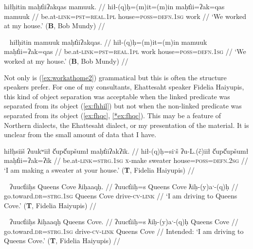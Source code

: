 \ex \label{ex:workathome}
\begingl
\glpreamble hiłḥitin maḥt̓iiʔakqas mamuuk. //
\gla hił-(q)ḥ=(m)it=(m)in maḥt̓ii=ʔak=qas mamuuk //
\glb be.at-\textsc{link}=\textsc{pst}=\textsc{real.1pl} house=\textsc{poss}=\textsc{defn.1sg} work //
\glft `We worked at my house.' (\textbf{B}, Bob Mundy) //
\endgl
\xe

\ex~ \label{ex:workathome2}
\begingl
\glpreamble hiłḥitin mamuuk maḥt̓iiʔakqas. //
\gla hił-(q)ḥ=(m)it=(m)in mamuuk maḥt̓ii=ʔak=qas //
\glb be.at-\textsc{link}=\textsc{pst}=\textsc{real.1pl} work house=\textsc{poss}=\textsc{defn.1sg} //
\glft `We worked at my house.' (\textbf{B}, Bob Mundy) //
\endgl
\xe

Not only is (\ref{ex:workathome2}) grammatical but this is often the structure speakers prefer. For one of my consultants, Ehattesaht speaker Fidelia Haiyupis, this kind of object separation was acceptable when the linked predicate was separated from its object (\ref{ex:fhhil}) but not when the non-linked predicate was separated from its object (\ref{ex:fhqc}, \ref{*ex:fhqc}). This may be a feature of Northern dialects, the Ehattesaht dialect, or my presentation of the material. It is unclear from the small amount of data that I have. %

\ex \label{ex:fhhil}
\begingl
\glpreamble hiłḥsiiš ʔuukʷiił č̓upč̓upšumł maḥt̓iiʔakʔik. //
\gla hił-(q)ḥ=siˑš ʔu-L.(č)iił č̓upč̓upšumł maḥt̓ii=ʔak=ʔik //
\glb be.at-\textsc{link}=\textsc{strg.1sg} \textsc{x}-make sweater house=\textsc{poss}=\textsc{defn.2sg} //
\glft `I am making a sweater at your house.' (\textbf{T}, Fidelia Haiyupis) //
\endgl
\xe

\ex~ \label{ex:fhqc}
\begingl
\glpreamble ʔuuct̓iiḥs Queens Cove ƛiḥaaqḥ. //
\gla ʔuuct̓iiḥ=s Queens Cove ƛiḥ-(y)aˑ-(q)ḥ //
\glb go.toward.\textsc{dr}=\textsc{strg.1sg} Queens Cove drive-\textsc{cv}-\textsc{link} //
\glft `I am driving to Queens Cove.' (\textbf{T}, Fidelia Haiyupis) //
\endgl
\xe

\ex~ \label{*ex:fhqc}
\begingl
\glpreamble *ʔuuct̓iiḥs ƛiḥaaqḥ Queens Cove. //
\gla ʔuuct̓iiḥ=s ƛiḥ-(y)aˑ-(q)ḥ Queens Cove //
\glb go.toward.\textsc{dr}=\textsc{strg.1sg} drive-\textsc{cv}-\textsc{link} Queens Cove //
\glft Intended: `I am driving to Queens Cove.' (\textbf{T}, Fidelia Haiyupis) //
\endgl
\xe

